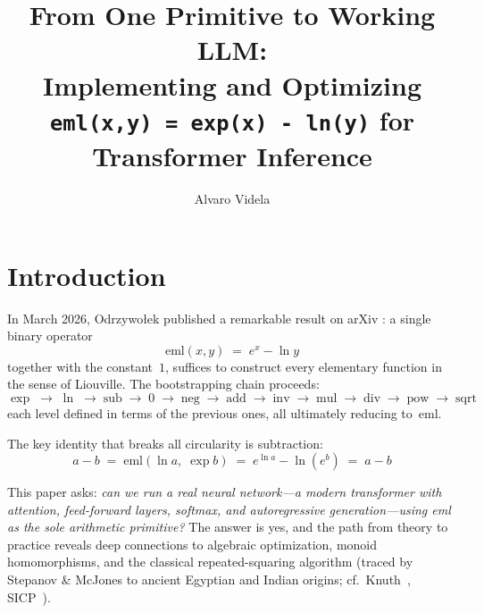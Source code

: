 \documentclass[acmsmall,nonacm]{acmart}
\title{From One Primitive to Working LLM:\\
  Implementing and Optimizing\\ \texttt{eml(x,y) = exp(x) - ln(y)} for Transformer Inference}
\author{Alvaro Videla}
\affiliation{%
  \institution{Microsoft}
}
\begin{document}
\maketitle

\section{Introduction}
\label{sec:intro}

In March 2026, Odrzywołek published a remarkable result on arXiv
\cite{odrzywołek2026}: a single binary operator
\begin{equation}\label{eq:eml}
  \mathrm{eml}(x, y) \;=\; e^x - \ln y
\end{equation}
together with the constant~$1$, suffices to construct every elementary
function in the sense of Liouville.  The bootstrapping chain proceeds:
\[
  \exp \;\to\; \ln \;\to\; \mathrm{sub} \;\to\; 0 \;\to\;
  \mathrm{neg} \;\to\; \mathrm{add} \;\to\; \mathrm{inv} \;\to\;
  \mathrm{mul} \;\to\; \mathrm{div} \;\to\; \mathrm{pow} \;\to\;
  \mathrm{sqrt}
\]
each level defined in terms of the previous ones, all ultimately
reducing to~$\mathrm{eml}$.

The key identity that breaks all circularity is subtraction:
\begin{equation}\label{eq:sub}
  a - b \;=\; \mathrm{eml}(\ln a,\;\exp b)
  \;=\; e^{\ln a} - \ln(e^b) \;=\; a - b
\end{equation}

This paper asks: \emph{can we run a real neural network---a modern
transformer with attention, feed-forward layers, softmax, and
autoregressive generation---using eml as the sole arithmetic
primitive?}  The answer is yes, and the path from theory to practice
reveals deep connections to algebraic optimization, monoid
homomorphisms, and the classical repeated-squaring algorithm
(traced by Stepanov \& McJones \cite{stepanov2009} to ancient
Egyptian and Indian origins; cf.\ Knuth~\cite{knuth1997},
SICP~\cite{sicp}).
\end{document}

